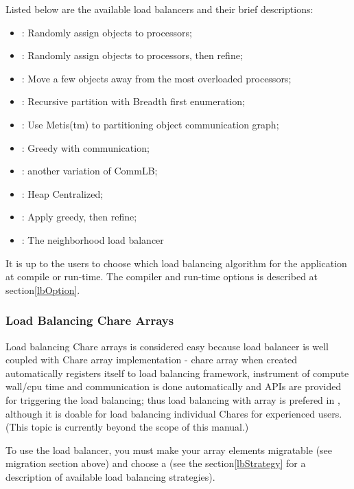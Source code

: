 Listed below are the available load balancers and their brief 
descriptions:
\begin{itemize}
\item {}:   Randomly assign objects to processors;
\item {}:    Randomly assign objects to processors, then refine;
\item {}:     Move a few objects away from the most overloaded processors;
\item {}:        Recursive partition with Breadth first enumeration;
\item {}:      Use Metis(tm) to partitioning object communication graph;
\item {}:       Greedy with communication;
\item {}:      another variation of CommLB;
\item {}:   Heap Centralized;
\item {}:  Apply greedy, then refine;
\item {}:   The neighborhood load balancer
\end{itemize}

It is up to the users to choose which load balancing algorithm for the 
application at compile or run-time. The compiler and run-time options 
is described at section\ref{lbOption}.

\subsubsection{Load Balancing Chare Arrays}
\label{lbarray}

Load balancing Chare arrays is considered easy because
load balancer is well coupled with Chare array implementation - 
chare array when created automatically registers itself to load balancing
framework, instrument of compute wall/cpu time and communication is 
done automatically and APIs are provided for triggering the load balancing; 
thus load balancing with array is prefered in \charmpp{}, although it is doable 
for load balancing individual Chares for experienced users. (This topic is 
currently beyond the scope of this manual.)

To use the load balancer, you must make your array elements migratable
(see migration section above) and choose a  
(see the section\ref{lbStrategy} for a description
of available load balancing strategies).


